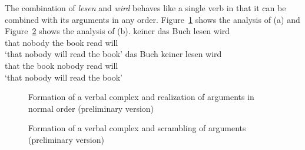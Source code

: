The combination of \emph{lesen} and \emph{wird} behaves like a single verb in that it can be
combined with its arguments in any order. Figure~\ref{fig-vc-nom-acc} shows the analysis of (a) and
Figure~\ref{fig-vc-acc-nom} shows the analysis of (b).
\eal
\ex\label{ex-dass-keiner-das-buch-lesen-wird}
\gll [dass]         keiner das Buch lesen wird\\
     \spacebr{}that nobody the book read will\\
\glt `that nobody will read the book'
\ex  
\gll [dass] das Buch keiner lesen wird\\
     \spacebr{}that the book nobody read will\\
\glt `that nobody will read the book'
\zl

\begin{figure}
\caption{\label{fig-vc-nom-acc}Formation of a verbal complex and realization of arguments in normal
  order (preliminary version)}
\end{figure}




\begin{figure}
\caption{\label{fig-vc-acc-nom}Formation of a verbal complex and scrambling of arguments (preliminary version)}
\end{figure}

